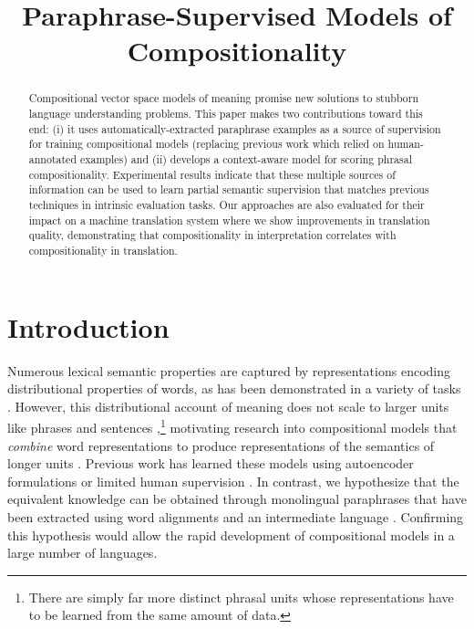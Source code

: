 \documentclass[11pt,letterpaper]{article}
\title{Paraphrase-Supervised Models of Compositionality}
\date{}
\newcommand{\ensuretext}[1]{#1}
\newcommand{\clabcomment}[3]{\ensuretext{\textcolor{#3}{[#1 #2]}}}
\newcommand{\cjdmarker}{\ensuretext{\textcolor{green}{\ensuremath{^{\textsc{cj}}_{\textsc{d}}}}}}
\newcommand{\cjd}[1]{\clabcomment{\cjdmarker}{#1}{green}}
\begin{document}
\maketitle
\begin{abstract}
Compositional vector space models of meaning promise new solutions to stubborn language understanding problems. 
This paper makes two contributions toward this end: (i) it uses automatically-extracted paraphrase examples as a source of supervision for training compositional models (replacing previous work which relied on human-annotated examples) and (ii) develops a context-aware model for scoring phrasal compositionality. 
	Experimental results indicate that these multiple sources of information can be used to learn partial semantic supervision that matches previous techniques in intrinsic evaluation tasks. 
	Our approaches are also evaluated for their impact on a machine translation system where we show improvements in translation quality, demonstrating that compositionality in interpretation correlates with compositionality in translation. 
 \end{abstract}

\section{Introduction}

Numerous lexical semantic properties are captured by representations encoding distributional properties of words, as has been demonstrated in a variety of tasks \cite{Turian2010,Turney2010,Mikolov2013b}.
However, this distributional account of meaning does not scale to larger units like phrases and sentences \cite[\emph{inter alia}]{Sahlgren2006,Collobert2011},\footnote{There are simply far more distinct phrasal units whose representations have to be learned from the same amount of data.} motivating research into compositional models that \emph{combine} word representations to produce representations of the semantics of longer units \cite{Mitchell2010,Baroni2010,Socher2013}.  
Previous work has learned these models using autoencoder formulations \cite{Socher2011} or limited human supervision \cite{Mitchell2010}.
In contrast, we hypothesize that the equivalent knowledge can be obtained through monolingual paraphrases that have been extracted using word alignments and an intermediate language \cite{Ganitkevich2013}.
Confirming this hypothesis would allow the rapid development of compositional models in a large number of languages. 
\end{document}
